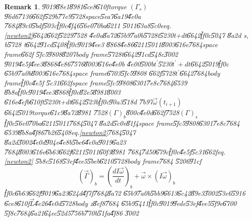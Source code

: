 \documentclass[12pt]{article}
\newtheorem{remark}[theorem]{Remark}
\begin{document}
\begin{remark}
\U{9019}\U{88e1}\U{8981}\U{6ce8}\U{610f}torque $\left( \Gamma _{s}\right) $%
\U{96d6}\U{7136}\U{662f}\U{529b}\U{77e9}\U{5728}space\U{5ea7}\U{6a19}\U{4e0a}%
\U{7684}\U{89c0}\U{5bdf}\U{503c}\U{ff0c}\U{4f46}\U{56e0}\U{70ba}\U{6211}%
\U{5011}\U{63a8}\U{5c0e}eq.\ref{newton2}\U{6642}\U{662f}\U{5229}\U{7528}%
\U{4e0a}\U{8a72}\U{65b9}\U{7a0b}\U{5728}t\U{5230}t+dt\U{6642}\U{ff0c}\U{5047}%
\U{8a2d} s, b\U{5728} t\U{6642}\U{91cd}\U{5408}\U{ff0c}\U{9019}\U{4ee3}%
\U{8868}\U{4e86}\U{6211}\U{5011}\U{8003}\U{616e}\U{7684}space frame\U{662f}%
\U{5fc5}\U{9808}\U{8207}body frame\U{5728}t\U{6642}\U{91cd}\U{548c}\U{3002}%
\U{9019}\U{4e5f}\U{4ee3}\U{8868}\U{4e86}\U{7576}\U{8003}\U{616e}\U{4e0b}%
\U{4e00}\U{500b}$t^{\prime }$\U{5230}$t^{\prime }+dt$\U{6642}\U{5019}\U{ff0c}%
\U{65b9}\U{7a0b}\U{8003}\U{616e}\U{7684}space frame\U{6703}\U{5fc5}\U{9808}%
\U{662f}\U{5728}$t^{\prime }$\U{6642}\U{7684}body frame\U{ff0c}\U{4e5f}%
\U{5c31}\U{662f}space frame\U{5fc5}\U{9808}\U{6301}\U{7e8c}\U{7684}\U{6539}%
\U{8b8a}\U{ff0c}\U{9019}\U{4ee3}\U{8868}\U{ff0c}\U{82e5}\U{8981}\U{8003}%
\U{616e}\U{4efb}\U{610f}t\U{5230}t+dt\U{6642}\U{523b}\U{ff0c}\U{90a3}\U{518d}%
\U{7b97}$\vec{\omega}(t_{i+1})$\U{6642}\U{5019}torque\U{61c9}\U{8a72}\U{8981}%
\U{7528}$\left( \Gamma \right) _{b}$\U{800c}\U{4e0d}\U{662f}\U{7528}$\left(
\Gamma \right) _{s}$\U{ff0c}\U{56e0}\U{70ba}\U{6211}\U{5011}\U{7684}\U{5047}%
\U{8a2d}\U{5c0e}\U{81f4}space frame\U{5fc5}\U{9808}\U{6301}\U{7e8c}\U{7684}%
\U{6539}\U{8b8a}\U{4f86}\U{7b26}\U{5408}eq.\ref{newton2}\U{7684}\U{5047}%
\U{8a2d}\U{3002}\U{4e0d}\U{904e}\U{4e8b}\U{5be6}\U{4e0a}\U{9019}\U{6a23}%
\U{7684}\U{8003}\U{616e}\U{6b63}\U{662f}\U{6211}\U{5011}\U{60f3}\U{8981}%
\U{7684}\U{7d50}\U{679c}\U{ff0c}\U{4e5f}\U{5c31}\U{662f}eq.\ref{newton2}%
\U{5b8c}\U{5168}\U{53ef}\U{4ee5}\U{5beb}\U{6210}\U{5728}body frame\U{7684}%
\U{5206}\U{91cf}%
\begin{equation}
\left( \vec{\Gamma}\right) _{b}=\left( \frac{dI\vec{\omega}}{dt}\right) _{b}+%
\vec{\omega}\times \left( I\vec{\omega}\right) _{b}
\end{equation}%
\U{ff0c}\U{6b63}\U{662f}\U{9019}\U{6a23}\U{624d}\U{4f7f}\U{7684}\U{8a72}%
\U{65b9}\U{7a0b}\U{5bb9}\U{6613}\U{6c42}\U{89e3}\U{3002}\U{53e6}\U{5916}%
\U{6ce8}\U{610f}$\vec{L}$\U{4e26}\U{4e0d}\U{5728}body z\U{8ef8}\U{7684}%
\U{65b9}\U{5411}\U{ff0c}\U{9019}\U{9ede}\U{53ef}\U{4ee5}\U{5f9e}\U{6700}%
\U{5f8c}\U{7684}\U{6a21}\U{64ec}\U{52d5}\U{756b}\U{770b}\U{51fa}\U{4f86}%
\U{3002}
\end{remark}
\end{document}
